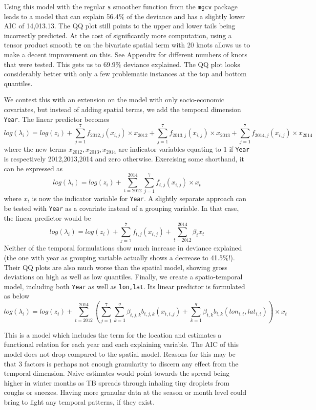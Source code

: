 Using this model with the regular \texttt{s} smoother function from the \texttt{mgcv} package leads to a model that can explain 56.4\% of the deviance and has a slightly lower AIC of 14,013.13. The QQ plot still points to the upper and lower tails being incorrectly predicted. At the cost of significantly more computation, using a tensor product smooth \texttt{te} on the bivariate spatial term with 20 knots allows us to make a decent improvement on this. See Appendix for different numbers of knots that were tested. This gets us to 69.9\% deviance explained. The QQ plot looks considerably better with only a few problematic instances at the top and bottom quantiles.

We contest this with an extension on the model with only socio-economic covariates, but instead of adding spatial terms, we add the temporal dimension \texttt{Year}. The linear predictor becomes
$$
log(\lambda_i) = log(z_i) +  \sum_{j=1}^{7}f_{2012, j}(x_{i,j})\times x_{2012}  + \sum_{j=1}^{7}f_{2013, j}(x_{i,j})\times x_{2013} +  \sum_{j=1}^{7}f_{2014, j}(x_{i,j})\times x_{2014}
$$
where the new terms $x_{2012},x_{2013},x_{2014}$ are indicator variables equating to 1 if \texttt{Year} is respectively 2012,2013,2014 and zero otherwise. Exercising some shorthand, it can be expressed as
$$
log(\lambda_i) = log(z_i) +  \sum_{t=2012}^{2014}\sum_{j=1}^{7}f_{t, j}(x_{i,j})\times x_{t}
$$
where $x_t$ is now the indicator variable for \texttt{Year}. A slightly separate approach can be tested with \texttt{Year} as a covariate instead of a grouping variable. In that case, the linear predictor would be
$$
log(\lambda_i) = log(z_i) +  \sum_{j=1}^{7}f_{t, j}(x_{i,j}) + \sum_{t=2012}^{2014}\beta_t x_t
$$
Neither of the temporal formulations show much increase in deviance explained (the one with year as grouping variable actually shows a decrease to 41.5\%!). Their QQ plots are also much worse than the spatial model, showing gross deviations on high as well as low quantiles. Finally, we create a spatio-temporal model, including both \texttt{Year} as well as \texttt{lon,lat}. Its linear predictor is formulated as below
$$
log(\lambda_i) = log(z_i) +  \sum_{t=2012}^{2014}\left( \sum_{j=1}^{7}\sum_{k=1}^{q}\beta_{t,j,k}b_{t,j,k}(x_{t,i,j}) + \sum_{k=1}^{q}\beta_{t,k}b_{t,k}(lon_{i,t} , lat_{i,t}) \right) \times x_{t}
$$


This is a model which includes the term for the location and estimates a functional relation for
each year and each explaining variable. The AIC of this model does not drop compared to the spatial model. Reasons for this may be that 3 factors is perhaps not enough granularity to discern any effect from the temporal dimension. Naive estimates would point towards the spread being higher in winter months as TB spreads through inhaling tiny droplets from coughs or sneezes. Having more granular data at the season or month level could bring to light any temporal patterns, if they exist.
\newline


